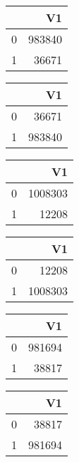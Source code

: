 \bigskip\bigskip
\centering
\begin{tabular}{rr}
  \hline
 & V1 \\ 
  \hline
0 & 983840 \\ 
  1 & 36671 \\ 
   \hline
\end{tabular}

\bigskip\bigskip
\centering
\begin{tabular}{rr}
  \hline
 & V1 \\ 
  \hline
0 & 36671 \\ 
  1 & 983840 \\ 
   \hline
\end{tabular}

\bigskip\bigskip
\centering
\begin{tabular}{rr}
  \hline
 & V1 \\ 
  \hline
0 & 1008303 \\ 
  1 & 12208 \\ 
   \hline
\end{tabular}

\bigskip\bigskip
\centering
\begin{tabular}{rr}
  \hline
 & V1 \\ 
  \hline
0 & 12208 \\ 
  1 & 1008303 \\ 
   \hline
\end{tabular}

\bigskip\bigskip
\centering
\begin{tabular}{rr}
  \hline
 & V1 \\ 
  \hline
0 & 981694 \\ 
  1 & 38817 \\ 
   \hline
\end{tabular}

\bigskip\bigskip
\centering
\begin{tabular}{rr}
  \hline
 & V1 \\ 
  \hline
0 & 38817 \\ 
  1 & 981694 \\ 
   \hline
\end{tabular}

